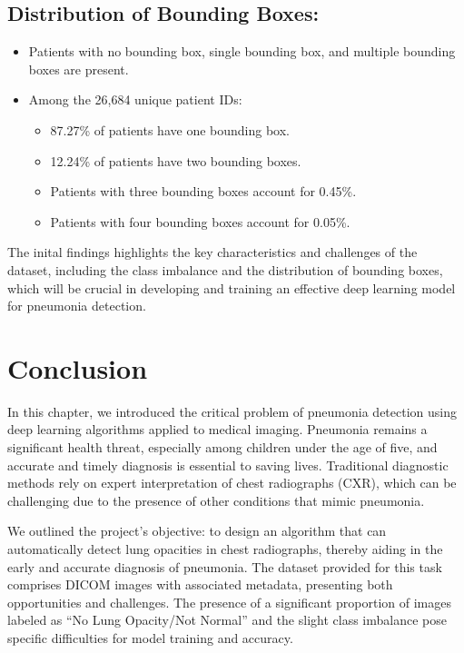 \subsection{Distribution of Bounding Boxes:}
\label{subsec:chap1 section 3.4}

\begin{itemize}
	\item  Patients with no bounding box, single bounding box, and multiple bounding boxes are present.
	\item Among the 26,684 unique patient IDs:
	      \begin{itemize}
		      \item 87.27\% of patients have one bounding box.
		      \item 12.24\% of patients have two bounding boxes.
		      \item Patients with three bounding boxes account for 0.45\%.
		      \item Patients with four bounding boxes account for 0.05\%.
	      \end{itemize}
\end{itemize}

The inital findings highlights the key characteristics and challenges of the dataset, including the class imbalance and the distribution of bounding boxes, which will be crucial in developing and training an effective deep learning model for pneumonia detection.

\section{Conclusion}
\label{sec:chap1 section 4}

In this chapter, we introduced the critical problem of pneumonia detection using deep learning algorithms applied to medical imaging. Pneumonia remains a significant health threat, especially among children under the age of five, and accurate and timely diagnosis is essential to saving lives. Traditional diagnostic methods rely on expert interpretation of chest radiographs (CXR), which can be challenging due to the presence of other conditions that mimic pneumonia.

We outlined the project's objective: to design an algorithm that can automatically detect lung opacities in chest radiographs, thereby aiding in the early and accurate diagnosis of pneumonia. The dataset provided for this task comprises DICOM images with associated metadata, presenting both opportunities and challenges. The presence of a significant proportion of images labeled as “No Lung Opacity/Not Normal” and the slight class imbalance pose specific difficulties for model training and accuracy.


